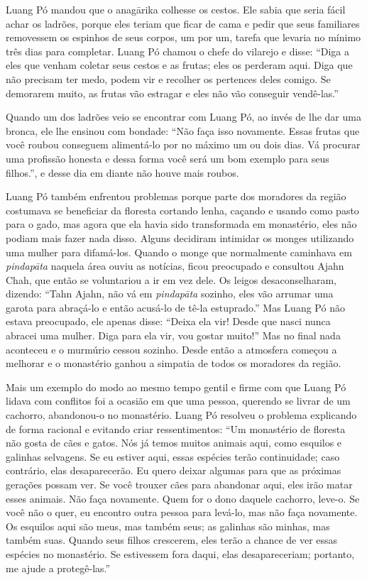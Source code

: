 Luang Pó mandou que o anagārika colhesse os cestos. Ele sabia que seria
fácil achar os ladrões, porque eles teriam que ficar de cama e pedir que
seus familiares removessem os espinhos de seus corpos, um por um, tarefa
que levaria no mínimo três dias para completar. Luang Pó chamou o chefe
do vilarejo e disse: ``Diga a eles que venham coletar seus cestos e as
frutas; eles os perderam aqui. Diga que não precisam ter medo, podem vir
e recolher os pertences deles comigo. Se demorarem muito, as frutas vão
estragar e eles não vão conseguir vendê-las.''

Quando um dos ladrões veio se encontrar com Luang Pó, ao invés de lhe
dar uma bronca, ele lhe ensinou com bondade: ``Não faça isso novamente.
Essas frutas que você roubou conseguem alimentá-lo por no máximo um ou
dois dias. Vá procurar uma profissão honesta e dessa forma você será um
bom exemplo para seus filhos.'', e desse dia em diante não houve mais
roubos.

Luang Pó também enfrentou problemas porque parte dos moradores da região
costumava se beneficiar da floresta cortando lenha, caçando e usando
como pasto para o gado, mas agora que ela havia sido transformada em
monastério, eles não podiam mais fazer nada disso. Alguns decidiram
intimidar os monges utilizando uma mulher para difamá-los. Quando o
monge que normalmente caminhava em \emph{pindapāta} naquela área ouviu
as notícias, ficou preocupado e consultou Ajahn Chah, que então se
voluntariou a ir em vez dele. Os leigos desaconselharam, dizendo: ``Tahn
Ajahn, não vá em \emph{pindapāta} sozinho, eles vão arrumar uma garota
para abraçá-lo e então acusá-lo de tê-la estuprado.'' Mas Luang Pó não
estava preocupado, ele apenas disse: ``Deixa ela vir! Desde que nasci
nunca abracei uma mulher. Diga para ela vir, vou gostar muito!'' Mas no
final nada aconteceu e o murmúrio cessou sozinho. Desde então a
atmosfera começou a melhorar e o monastério ganhou a simpatia de todos
os moradores da região.

Mais um exemplo do modo ao mesmo tempo gentil e firme com que Luang Pó
lidava com conflitos foi a ocasião em que uma pessoa, querendo se livrar
de um cachorro, abandonou-o no monastério. Luang Pó resolveu o problema
explicando de forma racional e evitando criar ressentimentos: ``Um
monastério de floresta não gosta de cães e gatos. Nós já temos muitos
animais aqui, como esquilos e galinhas selvagens. Se eu estiver aqui,
essas espécies terão continuidade; caso contrário, elas desaparecerão.
Eu quero deixar algumas para que as próximas gerações possam ver. Se
você trouxer cães para abandonar aqui, eles irão matar esses animais.
Não faça novamente. Quem for o dono daquele cachorro, leve-o. Se você
não o quer, eu encontro outra pessoa para levá-lo, mas não faça
novamente. Os esquilos aqui são meus, mas também seus; as galinhas são
minhas, mas também suas. Quando seus filhos crescerem, eles terão a
chance de ver essas espécies no monastério. Se estivessem fora daqui,
elas desapareceriam; portanto, me ajude a protegê-las.''

